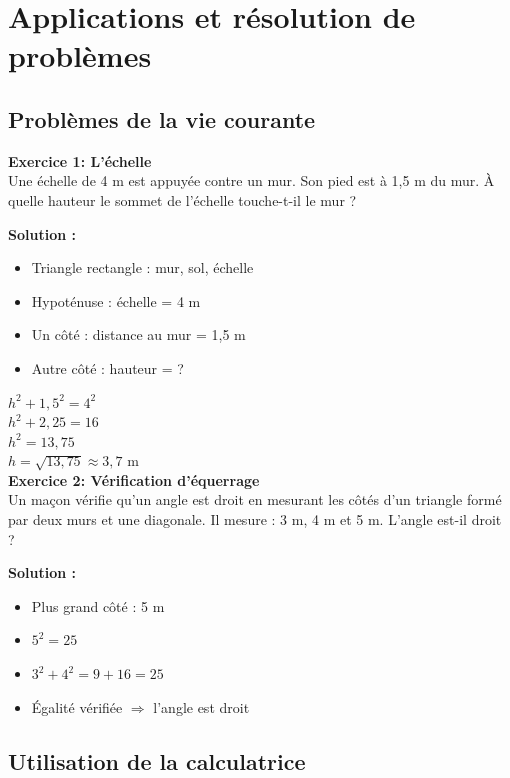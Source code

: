 \section{Applications et résolution de problèmes}

\subsection{Problèmes de la vie courante}

\begin{exercisebox}
\textbf{Exercice 1: L'échelle}\\

Une échelle de 4 m est appuyée contre un mur. Son pied est à 1,5 m du mur. À quelle hauteur le sommet de l'échelle touche-t-il le mur ?

\textbf{Solution :}

\begin{itemize}
    \item Triangle rectangle : mur, sol, échelle
    \item Hypoténuse : échelle = 4 m
    \item Un côté : distance au mur = 1,5 m
    \item Autre côté : hauteur = ?
\end{itemize}

$h^2 + 1,5^2 = 4^2$\\
$h^2 + 2,25 = 16$\\
$h^2 = 13,75$\\
$h = \sqrt{13,75} \approx 3,7$ m
\\

\textbf{Exercice 2: Vérification d'équerrage}\\

Un maçon vérifie qu'un angle est droit en mesurant les côtés d'un triangle formé par deux murs et une diagonale. Il mesure : 3 m, 4 m et 5 m. L'angle est-il droit ?

\textbf{Solution :}
\begin{itemize}
	\item Plus grand côté : 5 m
	\item $5^2 = 25$
	\item $3^2 + 4^2 = 9 + 16 = 25$
	\item Égalité vérifiée $\Rightarrow$ l'angle est droit
\end{itemize}
\end{exercisebox}

\subsection{Utilisation de la calculatrice}

